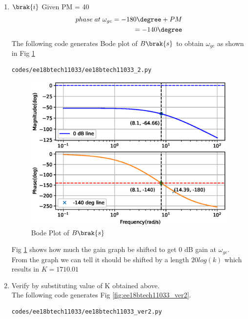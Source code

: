 \begin{enumerate}[label=\thesubsection.\arabic*.,ref=\thesubsection.\theenumi]
\item $\brak{i}$ Given PM = 40\degree
\\
\solution
\begin{align}
    phase\; at\; \omega_{gc} = -180\degree + PM
    \\
    = -140\degree
\end{align}
The following code generates Bode plot of $B\brak{s}$ to obtain $\omega_{gc}$ as shown in Fig \ref{fig:ee18btech11033_2}

\begin{lstlisting}
codes/ee18btech11033/ee18btech11033_2.py
\end{lstlisting}

\begin{figure}[!ht]
\centering
\includegraphics[width=\columnwidth]{./figs/ee18btech11033/ee18btech11033_2.eps}
\caption{Bode Plot of $B\brak{s}$}
\label{fig:ee18btech11033_2}
\end{figure}
Fig \ref{fig:ee18btech11033_2} shows how much the gain graph be shifted to get 0 dB gain at $\omega_{gc}$.
From the graph we can tell it should be shifted by a length $20log(k)$ which results in  $K =1710.01$ 
\item Verify by substituting value of K obtained above. 
\\
\solution The following code generates Fig \ref{fig:ee18btech11033_ver2}.

\begin{lstlisting}
codes/ee18btech11033/ee18btech11033_ver2.py
\end{lstlisting}


\end{enumerate}
